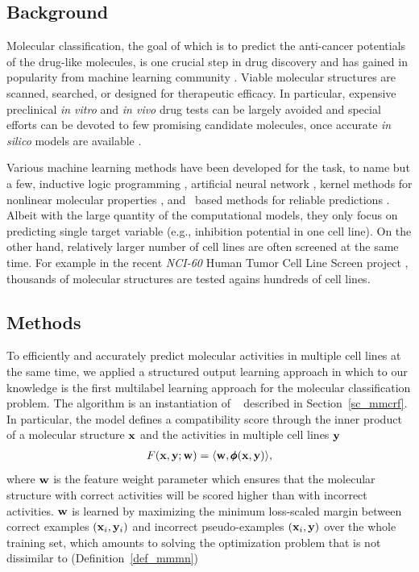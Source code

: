 {%
%
\subsection{Background}

Molecular classification, the goal of which is to predict the anti-cancer potentials of the drug-like molecules, is one crucial step in drug discovery and has gained in popularity from machine learning community \citep{Singh12qsar,Dutt12classification}.
Viable molecular structures are scanned, searched, or designed for therapeutic efficacy.
In particular, expensive preclinical \textit{in vitro} and \textit{in vivo} drug tests can be largely avoided and special efforts can be devoted to few promising candidate molecules, once accurate \textit{in silico} models are available \citep{Burbidg01drug}.

Various machine learning methods have been developed for the task, to name but a few, inductive logic programming \citep{King96structure}, artificial neural network \citep{Bernazzani06predicting}, kernel methods for nonlinear molecular properties \citep{Trotter01drug,Ralaivola05graph,Swamidass05kernel,Ceroni07classification}, and \svm\ based methods for reliable predictions \citep{Trotter01drug,Byvatov03comparison,Xue04effect}.
Albeit with the large quantity of the computational models, they only focus on predicting single target variable (e.g., inhibition potential in one cell line). 
On the other hand, relatively larger number of cell lines are often screened at the same time.
For example in the recent \textit{NCI-60} {Human Tumor Cell Line Screen} project \citep{Shoemaker06the}, thousands of molecular structures are tested agains hundreds of cell lines.



%
%
\subsection{Methods}

To efficiently and accurately predict molecular activities in multiple cell lines at the same time, we applied a structured output learning approach in  which to our knowledge is the first multilabel learning approach for the molecular classification problem.
The algorithm is an instantiation of \mmcrf\ \citep{Rousu07} described in Section~\ref{sc_mmcrf}.
In particular, the model defines a compatibility score through the inner product of a molecular structure $\mathbf {x}$ and the activities in multiple cell lines $\mathbf {y}$
\begin{align*}
	F(\mathbf {x},\mathbf {y};\mathbf {w}) = \langle \mathbf {w}, \pmb \phi(\mathbf {x},\mathbf {y}) \rangle,
\end{align*}
where $\mathbf {w}$ is the feature weight parameter which ensures that the molecular structure with correct activities will be scored higher than with incorrect activities.
$\mathbf {w}$ is learned by maximizing the minimum loss-scaled margin between correct examples $(\mathbf {x}_i,\mathbf {y}_i)$ and incorrect pseudo-examples $(\mathbf {x}_i,\mathbf {y})$ over the whole training set, which amounts to solving the optimization problem that is not dissimilar to (Definition~\ref{def_mmmn})

}
